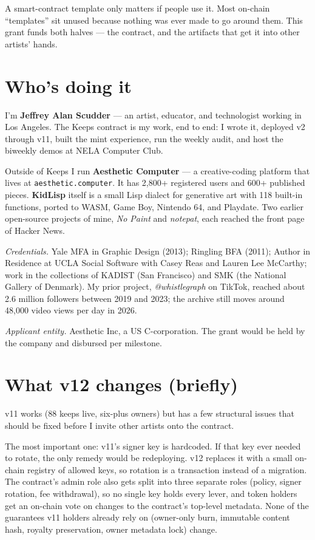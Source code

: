 \documentclass[11pt]{article}
\begin{document}
A smart-contract template only matters if people use it. Most on-chain ``templates'' sit unused because nothing was ever made to go around them. This grant funds both halves --- the contract, and the artifacts that get it into other artists' hands.

\section*{Who's doing it}

I'm \textbf{Jeffrey Alan Scudder} --- an artist, educator, and technologist working in Los Angeles. The Keeps contract is my work, end to end: I wrote it, deployed v2 through v11, built the mint experience, run the weekly audit, and host the biweekly demos at NELA Computer Club.

Outside of Keeps I run \textbf{Aesthetic Computer} --- a creative-coding platform that lives at \texttt{aesthetic.computer}. It has 2{,}800+ registered users and 600+ published pieces. \textbf{KidLisp} itself is a small Lisp dialect for generative art with 118 built-in functions, ported to WASM, Game Boy, Nintendo 64, and Playdate. Two earlier open-source projects of mine, \emph{No Paint} and \emph{notepat}, each reached the front page of Hacker News.

\textit{Credentials.} Yale MFA in Graphic Design (2013); Ringling BFA (2011); Author in Residence at UCLA Social Software with Casey Reas and Lauren Lee McCarthy; work in the collections of KADIST (San Francisco) and SMK (the National Gallery of Denmark). My prior project, \emph{@whistlegraph} on TikTok, reached about 2.6 million followers between 2019 and 2023; the archive still moves around 48{,}000 video views per day in 2026.

\textit{Applicant entity.} Aesthetic Inc, a US C-corporation. The grant would be held by the company and disbursed per milestone.

\section*{What v12 changes (briefly)}

v11 works (88 keeps live, six-plus owners) but has a few structural issues that should be fixed before I invite other artists onto the contract.

The most important one: v11's signer key is hardcoded. If that key ever needed to rotate, the only remedy would be redeploying. v12 replaces it with a small on-chain registry of allowed keys, so rotation is a transaction instead of a migration. The contract's admin role also gets split into three separate roles (policy, signer rotation, fee withdrawal), so no single key holds every lever, and token holders get an on-chain vote on changes to the contract's top-level metadata. None of the guarantees v11 holders already rely on (owner-only burn, immutable content hash, royalty preservation, owner metadata lock) change.
\end{document}

